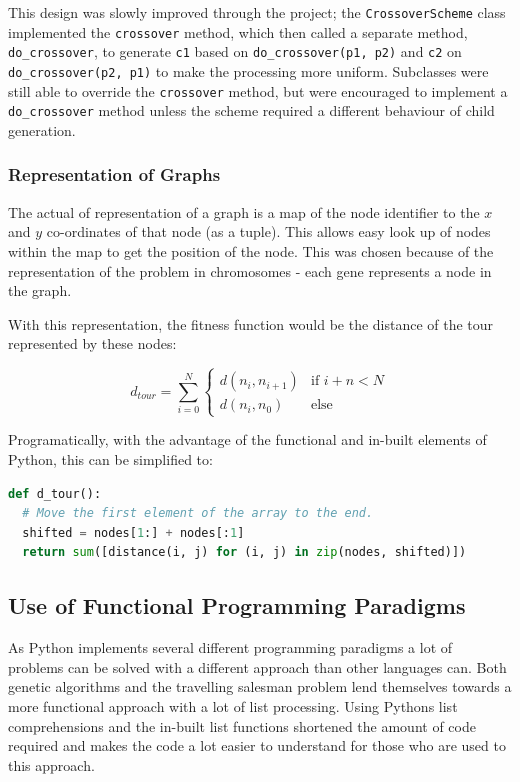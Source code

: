\documentclass[10pt, a4paper]{article}
\begin{document}
This design was slowly improved through the project; the
\texttt{CrossoverScheme} class implemented the \texttt{crossover} method, 
which then called a separate method, \texttt{do\_crossover}, to generate 
\texttt{c1} based on \texttt{do\_crossover(p1, p2)} and \texttt{c2} on 
\texttt{do\_crossover(p2, p1)} to make the processing more uniform. Subclasses
were still able to override the \texttt{crossover} method, but were encouraged
to implement a \texttt{do\_crossover} method unless the scheme required a
different behaviour of child generation.


\subsubsection{Representation of Graphs}

The actual of representation of a graph is a map of the node identifier to the
$x$ and $y$ co-ordinates of that node (as a tuple). This allows easy look up 
of nodes within the map to get the position of the node. This was chosen 
because of the representation of the problem in chromosomes - each gene 
represents a node in the graph.

With this representation, the fitness function would be the distance of the 
tour represented by these nodes:

\begin{equation}
d_{tour} = \sum^{N}_{i=0}{
  \begin{cases}
    d(n_i, n_{i+1}) & \text{if } i+n < N \\ 
    d(n_i, n_0)     & \text{else}
  \end{cases}
}
\end{equation}

Programatically, with the advantage of the functional and in-built elements of 
Python, this can be simplified to:

\lstset{language=Python}
\begin{lstlisting}[language=Python, caption=Distance of a tour]
def d_tour():
  # Move the first element of the array to the end.
  shifted = nodes[1:] + nodes[:1]
  return sum([distance(i, j) for (i, j) in zip(nodes, shifted)])
\end{lstlisting}

\subsection{Use of Functional Programming Paradigms}

As Python implements several different programming paradigms a lot of problems
can be solved with a different approach than other languages can. Both genetic
algorithms and the travelling salesman problem lend themselves towards a more
functional approach with a lot of list processing. Using Pythons list
comprehensions and the in-built list functions shortened the amount of code 
required and makes the code a lot easier to understand for those who are used 
to this approach.
\end{document}
